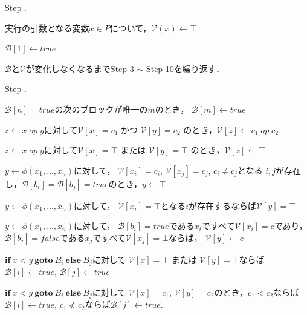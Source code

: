 \documentclass[dvipdfmx]{beamer}
\newcounter{coffee}
\begin{document}
\begin{frame}
  {\scriptsize 
  \begin{list}{Step .}{}
    \item 実行の引数となる変数$x\in P$について，$\mathcal{V}(x)\leftarrow\top$ 
    \item $\mathcal{B}[1]\leftarrow true$
  \end{list}
  $\mathcal{B}$と$\mathcal{V}$が変化しなくなるまでStep 3 $\sim$ Step 10を繰り返す．
  \begin{list}{Step .}{\setcounter{coffee}{2}}
    \item
    $\mathcal{B}[n]=true$の次のブロックが唯一の$m$のとき，
    $\mathcal{B}[m]\leftarrow true$
    \item $z\leftarrow x\; op\; y$に対して$\mathcal{V}[x]=c_1$ かつ $\mathcal{V}[y]=c_2$
    のとき，$\mathcal{V}[z]\leftarrow c_1\; op\; c_2$
    \item $z\leftarrow x\; op\; y$に対して$\mathcal{V}[x]=\top$ または $\mathcal{V}[y]=\top$
    のとき，$\mathcal{V}[z]\leftarrow\top$
    \item $y\leftarrow\phi(x_1,\ldots,x_n)$に対して，
    $\mathcal{V}[x_i]=c_i$, $\mathcal{V}[x_j]=c_j$, $c_i\not=c_j$となる
    $i,j$が存在し，$\mathcal{B}[b_i]=\mathcal{B}[b_j]=true$のとき，$y\leftarrow\top$
    \item $y\leftarrow\phi(x_1,\ldots,x_n)$に対して，
    $\mathcal{V}[x_i]=\top$となる$i$が存在するならば$\mathcal{V}[y]=\top$
    \item $y\leftarrow\phi(x_1,\ldots,x_n)$に対して，
    $\mathcal{B}[b_i]=true$である$x_i$ですべて$\mathcal{V}[x_i]=c$であり，
    $\mathcal{B}[b_j]=false$である$x_j$ですべて$\mathcal{V}[x_j]=\bot$ならば，
    $\mathcal{V}[y]\leftarrow c$
    \item $\mathbf{if}\ x<y\ \mathbf{goto}\ B_i\ \mathbf{else}\ B_j$に対して
    $\mathcal{V}[x]=\top$ または $\mathcal{V}[y]=\top$ならば
    $\mathcal{B}[i]\leftarrow true$, $\mathcal{B}[j]\leftarrow true$
    \item $\mathbf{if}\ x<y\ \mathbf{goto}\ B_i\ \mathbf{else}\ B_j$に対して
    $\mathcal{V}[x]=c_1$, $\mathcal{V}[y]=c_2$のとき，$c_1<c_2$ならば
    $\mathcal{B}[i]\leftarrow true$, $c_1\not<c_2$ならば$\mathcal{B}[j]\leftarrow true$.
  \end{list}
  }

\end{frame}
\end{document}
